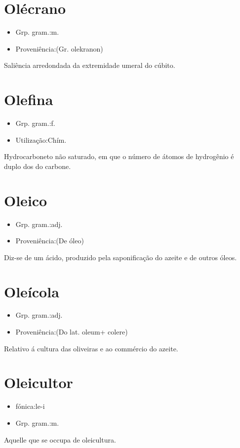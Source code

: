 \section{Olécrano}
\begin{itemize}
\item {Grp. gram.:m.}
\end{itemize}
\begin{itemize}
\item {Proveniência:(Gr. \textunderscore olekranon\textunderscore )}
\end{itemize}
Saliência arredondada da extremidade umeral do cúbito.
\section{Olefina}
\begin{itemize}
\item {Grp. gram.:f.}
\end{itemize}
\begin{itemize}
\item {Utilização:Chím.}
\end{itemize}
Hydrocarboneto não saturado, em que o número de átomos de hydrogênio é duplo dos do carbone.
\section{Oleico}
\begin{itemize}
\item {Grp. gram.:adj.}
\end{itemize}
\begin{itemize}
\item {Proveniência:(De \textunderscore óleo\textunderscore )}
\end{itemize}
Diz-se de um ácido, produzido pela saponificação do azeite e de outros óleos.
\section{Oleícola}
\begin{itemize}
\item {Grp. gram.:adj.}
\end{itemize}
\begin{itemize}
\item {Proveniência:(Do lat. \textunderscore oleum\textunderscore  + \textunderscore colere\textunderscore )}
\end{itemize}
Relativo á cultura das oliveiras e ao commércio do azeite.
\section{Oleicultor}
\begin{itemize}
\item {fónica:le-i}
\end{itemize}
\begin{itemize}
\item {Grp. gram.:m.}
\end{itemize}
Aquelle que se occupa de oleicultura.
